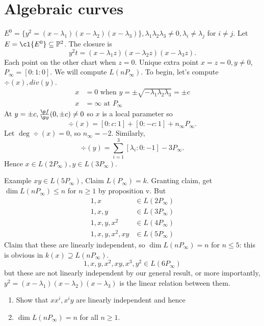 \documentclass[a4paper]{article}
\renewcommand*{\P}{\mathbb{P}}
\begin{document}
\iffalse

\section{Algebraic curves}

\begin{eg}
  \(E^0 = \{y^2 = (x - \lambda_1)(x - \lambda_2)(x - \lambda_3)\}, \lambda_1\lambda_2\lambda_3 \neq 0, \lambda_i \neq \lambda_j\) for \(i \neq j\). Let \(E = \cl{E^0} \subseteq \P^2\). The closure is
  \[
    y^2t = (x - \lambda_1z)(x - \lambda_2z)(x - \lambda_3z).
  \]
  Each point on the other chart when \(z = 0\). Unique extra point \(x = z = 0, y \neq 0\), \(P_\infty = [0:1:0]\). We will compute \(L(nP_\infty)\). To begin, let's compute \(\div(x), div(y)\).
  \begin{align*}
    x &= 0 \text{ when } y = \pm \sqrt{-\lambda_1\lambda_2\lambda_3} = \pm c \\
    x &= \infty \text{ at } P_\infty
  \end{align*}
  At \(y = \pm c, \frac{\p f}{\p y} (0, \pm c) \neq 0\) so \(x\) is a local parameter so
  \[
    \div(x) = [0: c: 1] + [0: -c: 1] + n_\infty P_\infty.
  \]
  Let \(\deg \div(x) = 0\), so \(n_\infty = -2\). Similarly,
  \[
    \div(y) = \sum_{i = 1}^3 [\lambda_i: 0: -1] - 3 P_\infty.
  \]
  Hence \(x \in L(2 P_\infty), y \in L(3 P_\infty)\).

  Example \(xy \in L(5P_\infty)\), Claim \(L(P_\infty) = k\). Granting claim, get \(\dim L(nP_\infty) \leq n\) for \(n \geq 1\) by proposition v. But
  \begin{align*}
    1, x &\in L(2P_\infty) \\
    1, x, y &\in L(3P_\infty) \\
    1, x, y, x^2 &\in L(4P_\infty) \\
    1, x, y, x^2, xy &\in L(5P_\infty)
  \end{align*}
  Claim that these are linearly independent, so \(\dim L(nP_\infty) = n\) for \(n \leq 5\): this is obvious in \(k(x) \supseteq L(nP_\infty)\).
  \[
    1, x, y, x^2, xy, x^3, y^2 \in L(6P_\infty)
  \]
  but these are not linearly independent by our general result, or more importantly, \(y^2 = (x - \lambda_1)(x - \lambda_2)(x - \lambda_3)\) is the linear relation between them.
  \begin{ex}\leavevmode
    \begin{enumerate}
    \item Show that \(xx^i, x^iy\) are linearly independent and hence
    \item \(\dim L(nP_\infty) = n\) for all \(n \geq 1\).
    \end{enumerate}
  \end{ex}


\end{eg}
\end{document}
